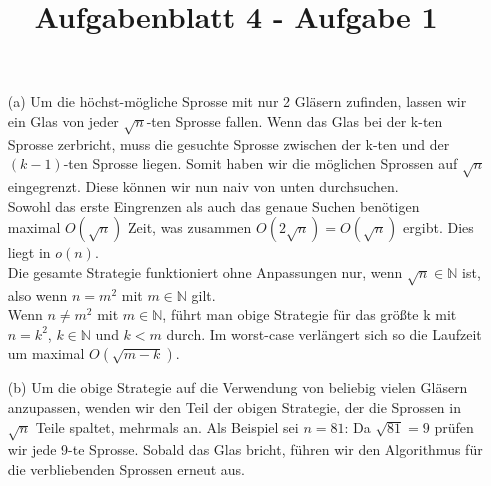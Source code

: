 \documentclass{article}
\title{Aufgabenblatt 4 - Aufgabe 1}
\author{}
\begin{document}
\maketitle

\begin{enumerate}
\item[(a)]Um die h\"ochst-m\"ogliche Sprosse mit nur 2 Gl\"asern zufinden, lassen wir ein Glas von jeder $\sqrt{n}$-ten Sprosse fallen. Wenn das Glas bei der k-ten Sprosse zerbricht, muss die gesuchte Sprosse zwischen der k-ten und der $(k-1)$-ten Sprosse liegen. Somit haben wir die m\"oglichen Sprossen auf $\sqrt{n}$ eingegrenzt. Diese können wir nun naiv von unten durchsuchen. \\
Sowohl das erste Eingrenzen als auch das genaue Suchen ben\"otigen \\maximal $O\left(\sqrt{n}\right)$ Zeit, was zusammen $O\left(2\sqrt{n}\right)=O\left(\sqrt{n}\right)$ ergibt. Dies liegt in $o(n)$. \\
Die gesamte Strategie funktioniert ohne Anpassungen nur, wenn $\sqrt{n}\in\mathbb{N}$ ist, also wenn $n=m^2$ mit $m\in\mathbb{N}$ gilt. \\
Wenn $n{\neq}m^2$ mit $m\in\mathbb{N}$, führt man obige Strategie für das gr\"o{\ss}te k mit $n=k^2$, $k\in\mathbb{N}$ und $k<m$ durch. Im worst-case verl\"angert sich so die Laufzeit um maximal $O(\sqrt{m-k})$.

\item[(b)]Um die obige Strategie auf die Verwendung von beliebig vielen Gl\"asern anzupassen, wenden wir den Teil der obigen Strategie, der die Sprossen in $\sqrt{n}$ Teile spaltet, mehrmals an. Als Beispiel sei $n=81$: Da $\sqrt{81}=9$ pr\"ufen wir jede 9-te Sprosse. Sobald das Glas bricht, führen wir den Algorithmus f\"ur die verbliebenden Sprossen erneut aus.\\
\end{enumerate}
\end{document}
